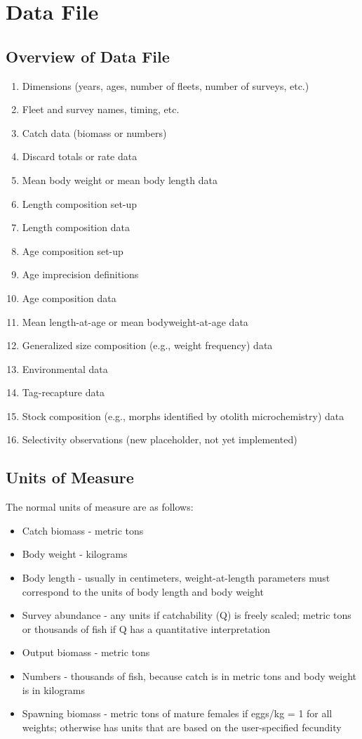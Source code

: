 \section{Data File}
\subsection{Overview of Data File}
	\begin{enumerate}
		\item Dimensions (years, ages, number of fleets, number of surveys, etc.)
		\item Fleet and survey names, timing, etc.
		\item Catch data (biomass or numbers)
		\item Discard totals or rate data
		\item Mean body weight or mean body length data
		\item Length composition set-up
		\item Length composition data
		\item Age composition set-up
		\item Age imprecision definitions
		\item Age composition data
		\item Mean length-at-age or mean bodyweight-at-age data
		\item Generalized size composition (e.g., weight frequency) data
		\item Environmental data
		\item Tag-recapture data
		\item Stock composition (e.g., morphs identified by otolith microchemistry) data
		\item Selectivity observations (new placeholder, not yet implemented)
	\end{enumerate}
	
\hypertarget{UnitsOfMeasure}{}
\subsection{Units of Measure}
The normal units of measure are as follows:
\begin{itemize}
	\item Catch biomass - metric tons	
	\item Body weight - kilograms	
	\item Body length - usually in centimeters, weight-at-length parameters must correspond to the units of body length and body weight	
	\item Survey abundance - any units if catchability (Q) is freely scaled; metric tons or thousands of fish if Q has a quantitative interpretation	
	\item Output biomass - metric tons	
	\item Numbers - thousands of fish, because catch is in metric tons and body weight is in kilograms	
	\item Spawning biomass - metric tons of mature females if eggs/kg = 1 for all weights; otherwise has units that are based on the user-specified fecundity	
\end{itemize}

